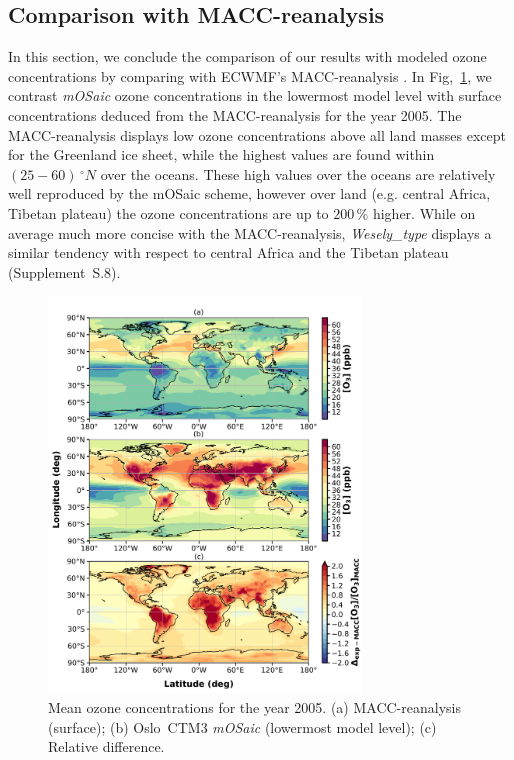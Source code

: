 \documentclass[gmd, manuscript]{copernicus}
\begin{document}
\subsection{Comparison with MACC-reanalysis}
\label{subsec:macc}
In this section, we conclude the comparison of our results with modeled ozone concentrations by comparing with ECWMF's MACC-reanalysis \citep{MACC}.
In Fig,~\ref{fig:macc_o3conc}, we contrast \emph{mOSaic} ozone concentrations in the lowermost model level with surface concentrations deduced from the MACC-reanalysis for the year 2005. The MACC-reanalysis displays low ozone concentrations above all land masses except for the Greenland ice sheet, while the highest values are found within $(25-60)\,\unit{^\circ N}$ over the oceans. These high values over the oceans are relatively well reproduced by the mOSaic scheme, however over land (e.g. central Africa, Tibetan plateau) the ozone concentrations are up to $200\,\unit{\%}$ higher. While on average much more concise with the MACC-reanalysis, \emph{Wesely\_type} displays a similar tendency with respect to central Africa and the Tibetan plateau (Supplement~S.8).  

\begin{figure}[t]
  \includegraphics[width=8.3cm]{fig08}
  \caption{Mean ozone concentrations for the year 2005. (a) MACC-reanalysis (surface); (b) Oslo~CTM3 \emph{mOSaic} (lowermost model level); (c) Relative difference.}
  \label{fig:macc_o3conc}
\end{figure}

\end{document}
